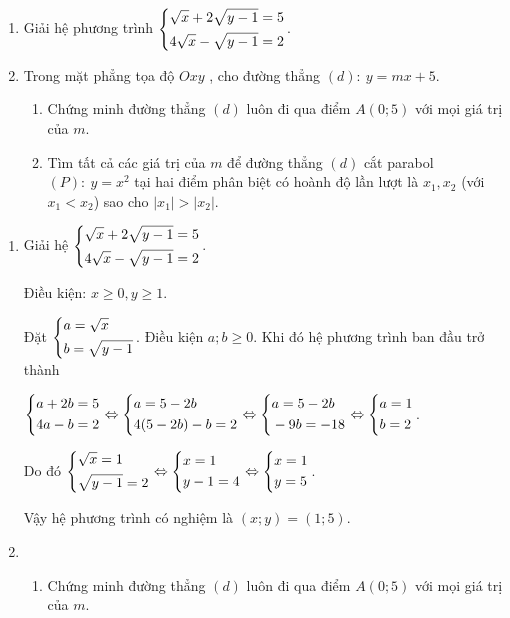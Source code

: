 \begin{ex}%

\hfill 
\begin{enumerate} 
		
	\item Giải hệ phương trình 
	$\left\{\begin{aligned}\sqrt{x}+2\sqrt{y-1}=5\\ 4\sqrt{x}-\sqrt{y-1}=2\end{aligned}\right.$.
	\item Trong mặt phẳng tọa độ $Oxy$ , cho đường thẳng $(d) : \ y=mx+5$.
	\begin{enumerate}
		\item Chứng minh đường thẳng $(d)$ luôn đi qua điểm $A(0;5)$ với mọi giá trị của $m$.
		\item Tìm tất cả các giá trị của $m$ để đường thẳng $(d)$ cắt parabol $(P):\ y=x^2$ tại hai điểm phân biệt có hoành độ lần lượt là $x_1, x_2$ (với $x_1 < x_2$) sao cho $|x_1|>|x_2|$.
		
	\end{enumerate}
\end{enumerate}
\loigiai
{	
	\begin{enumerate}
		\item Giải hệ $\left\{\begin{aligned}\sqrt{x}+2\sqrt{y-1}=5\\ 4\sqrt{x}-\sqrt{y-1}=2\end{aligned}\right.$.
		
		Điều kiện: $ x \ge 0, y\ge 1.$
		
		Đặt $\left\{\begin{aligned}&a=\sqrt{x}\\&b=\sqrt{y-1}\end{aligned}\right.$. Điều kiện $a;b\ge 0$. Khi đó hệ phương trình ban đầu trở thành
		
		$\left\{\begin{aligned}&a+2b=5\\&4a-b=2\end{aligned}\right. \Leftrightarrow \left\{\begin{aligned}&a=5-2b\\&4(5-2b)-b=2\end{aligned}\right. \Leftrightarrow \left\{\begin{aligned}&a=5-2b\\&-9b=-18\end{aligned}\right. 
		\Leftrightarrow
		\left\{\begin{aligned}&a=1\\&b=2\end{aligned}\right.$.
		
		Do đó $\left\{\begin{aligned}&\sqrt{x}=1\\&\sqrt{y-1}=2\end{aligned}\right. \Leftrightarrow \left\{\begin{aligned}&x=1\\&y-1=4\end{aligned}\right. \Leftrightarrow \left\{\begin{aligned}&x=1\\&y=5\end{aligned}\right.$.
		
		Vậy hệ phương trình có nghiệm là $(x;y)=(1;5).$
		\item 
	
	\begin{enumerate}
			\item Chứng minh đường thẳng $(d)$ luôn đi qua điểm $A(0;5)$ với mọi giá trị của $m$. 
			

\end{enumerate}
\end{enumerate}}
\end{ex}
